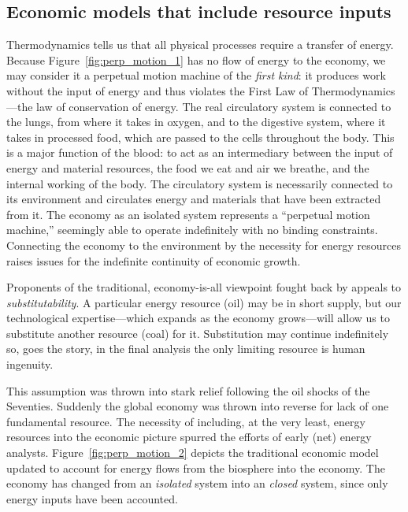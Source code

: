 \subsection{Economic models that include resource inputs}
\label{sec:metaphor_resource}

Thermodynamics tells us that all physical processes require
a transfer of energy.
Because Figure~\ref{fig:perp_motion_1} has no flow of energy
to the economy,
we may consider it a perpetual motion machine
of the \emph{first kind}:
it produces work without the input of energy and
thus violates the First Law of Thermodynamics---the 
law of conservation of energy.\cite{Rao2004}
The real circulatory system is connected to the lungs,
from where it takes in oxygen,
and to the digestive system, 
where it takes in processed food,
which are passed to the cells throughout the body.
This is a major function of the blood:
to act as an intermediary between the input of energy
and material resources,
the food we eat and air we breathe,
and the internal working of the body.
The circulatory system is necessarily connected 
to its environment and circulates energy and materials
that have been extracted from it.
The economy as an isolated system
represents a ``perpetual motion machine,'' %
seemingly able to operate indefinitely with 
no binding constraints.
Connecting the economy to the environment
by the necessity for energy
resources raises issues for the indefinite
continuity of economic growth.

Proponents of the traditional, 
economy-is-all viewpoint fought back
by appeals to \emph{substitutability}.
A particular energy resource (oil) may be in short supply,
but our technological expertise---which expands
as the economy grows---will allow us to substitute
another resource (coal) for it.
Substitution may continue indefinitely so,
goes the story,
in the final analysis the only limiting resource is
human ingenuity.\cite{Simon1981, Simon1998}

This assumption was thrown into stark relief following the oil
shocks of the Seventies.
Suddenly the global economy was thrown
into reverse for lack of one fundamental resource.
The necessity of including,
at the very least,
energy resources into the economic picture
spurred the efforts of early (net) energy 
analysts.\cite{Gilliland1975, Chapman1976}
Figure~\ref{fig:perp_motion_2} depicts the traditional
economic model updated to account for 
energy flows from the biosphere
into the economy.
The economy has changed from an \emph{isolated}
system into an \emph{closed} system,
since only energy inputs have been accounted.

